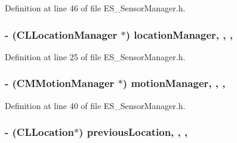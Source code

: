 Definition at line 46 of file E\+S\+\_\+\+Sensor\+Manager.\+h.

\hypertarget{interface_e_s___sensor_manager_ae7f8aa8184fb028d3c50004d7f3fbe07}{
\subsubsection[{location\+Manager}]{\setlength{\rightskip}{0pt plus 5cm}-\/ (C\+L\+Location\+Manager $\ast$) location\+Manager\hspace{0.3cm}{\ttfamily [read]}, {\ttfamily [write]}, {\ttfamily [nonatomic]}, {\ttfamily [strong]}}}\label{interface_e_s___sensor_manager_ae7f8aa8184fb028d3c50004d7f3fbe07}


Definition at line 25 of file E\+S\+\_\+\+Sensor\+Manager.\+h.

\hypertarget{interface_e_s___sensor_manager_a23ed2528ff350f481910e6f2a2fc8657}{
\subsubsection[{motion\+Manager}]{\setlength{\rightskip}{0pt plus 5cm}-\/ (C\+M\+Motion\+Manager $\ast$) motion\+Manager\hspace{0.3cm}{\ttfamily [read]}, {\ttfamily [write]}, {\ttfamily [nonatomic]}, {\ttfamily [strong]}}}\label{interface_e_s___sensor_manager_a23ed2528ff350f481910e6f2a2fc8657}


Definition at line 40 of file E\+S\+\_\+\+Sensor\+Manager.\+h.

\hypertarget{interface_e_s___sensor_manager_a31827eb8eea66c5d077873a73b3b2ef7}{
\subsubsection[{previous\+Location}]{\setlength{\rightskip}{0pt plus 5cm}-\/ (C\+L\+Location$\ast$) previous\+Location\hspace{0.3cm}{\ttfamily [read]}, {\ttfamily [write]}, {\ttfamily [nonatomic]}, {\ttfamily [strong]}}}\label{interface_e_s___sensor_manager_a31827eb8eea66c5d077873a73b3b2ef7}


